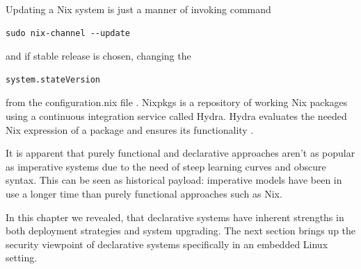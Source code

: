 Updating a Nix system is just a manner of invoking command

\begin{lstlisting}
sudo nix-channel --update
\end{lstlisting}
and if stable release is chosen, changing the
\begin{lstlisting}
system.stateVersion
\end{lstlisting}
from the configuration.nix file \cite{nixosNixOSManual}. Nixpkgs is a
repository of working Nix packages using a continuous integration
service called Hydra. Hydra evaluates the needed Nix expression of a
package and ensures its functionality \cite{nixosNixOSManual}.

It is apparent that purely functional and declarative approaches aren't as popular
as imperative systems due to the need of steep learning curves and
obscure syntax. This can be seen as historical payload: imperative
models have been in use a longer time than purely functional
approaches such as Nix.

In this chapter we revealed, that declarative systems have inherent
strengths in both deployment strategies and system upgrading. The next
section brings up the security viewpoint of declarative systems
specifically in an embedded Linux setting.
